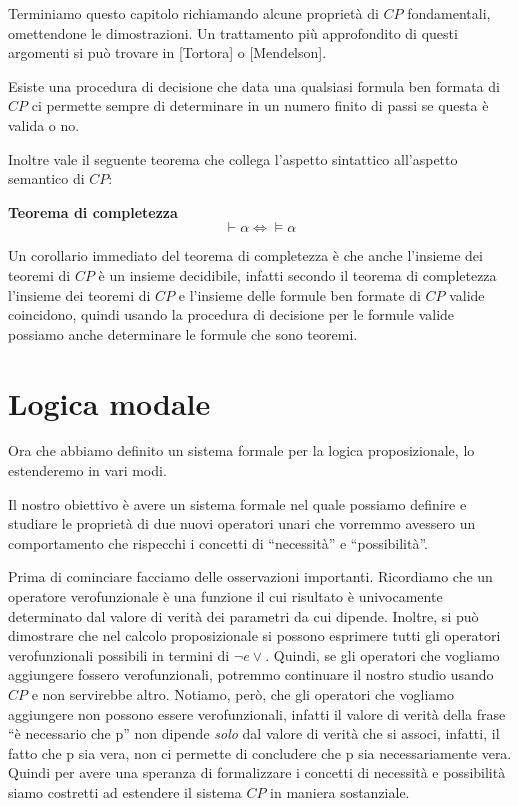 \documentclass[a4paper, 12pt]{article}
\begin{document}
Terminiamo questo capitolo richiamando alcune proprietà di $CP$ fondamentali, omettendone
le dimostrazioni. Un trattamento più approfondito di questi argomenti si può trovare in
[Tortora] o [Mendelson].

Esiste una procedura di decisione che data una qualsiasi formula ben formata di $CP$
ci permette sempre di determinare in un numero finito di passi se questa è valida o no.

Inoltre vale il seguente teorema che collega l'aspetto sintattico all'aspetto semantico
di $CP$:

\begin{flushleft}
\textbf{Teorema di completezza}
$$\vdash \alpha \Leftrightarrow \vDash \alpha$$
\end{flushleft}

Un corollario immediato del teorema di completezza è che anche l'insieme dei teoremi
di $CP$ è un insieme decidibile, infatti secondo il teorema di completezza
l'insieme dei teoremi di $CP$ e l'insieme delle formule ben formate di $CP$ valide
coincidono, quindi usando la procedura di decisione per le formule valide
possiamo anche determinare le formule che sono teoremi.

\section{Logica modale}
Ora che abbiamo definito un sistema formale per la logica proposizionale,
lo estenderemo in vari modi.

Il nostro obiettivo è avere un sistema formale nel quale possiamo definire e studiare
le proprietà di due nuovi operatori unari che vorremmo avessero un comportamento che rispecchi
i concetti di ``necessità'' e ``possibilità''.

Prima di cominciare facciamo delle osservazioni importanti.
Ricordiamo che un operatore verofunzionale è una funzione il cui risultato
è univocamente determinato dal valore di verità dei parametri da cui dipende.
Inoltre, si può dimostrare che nel calcolo proposizionale si possono esprimere
tutti gli operatori verofunzionali possibili in termini di $\neg e \vee$.
Quindi, se gli operatori che vogliamo aggiungere fossero verofunzionali, potremmo
continuare il nostro studio usando $CP$ e non servirebbe altro.
Notiamo, però, che gli operatori che vogliamo aggiungere non possono essere verofunzionali,
infatti il valore di verità della frase ``è necessario che p'' non dipende \textit{solo}
dal valore di verità che si associ, infatti, il fatto che p sia vera, non ci permette
di concludere che p sia necessariamente vera. Quindi per avere una speranza di formalizzare
i concetti di necessità e possibilità siamo costretti ad estendere il sistema $CP$
in maniera sostanziale.
\end{document}
